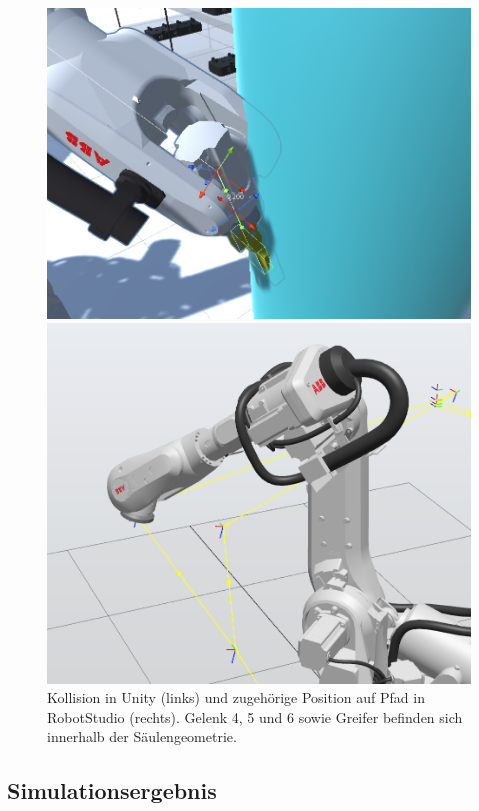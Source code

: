 \begin{figure}[!htb]
	\centering
	\begin{minipage}{.535\textwidth}
		\centering
		\includegraphics[width=0.9\linewidth]{Figures/CollisionUnity.png}
	\end{minipage}%
	\begin{minipage}{0.465\textwidth}
		\centering
		\includegraphics[width=0.9\linewidth]{Figures/CollisionPathRobotStudio.png}
	\end{minipage}
	\caption{Kollision in Unity (links) und zugehörige Position auf Pfad in
		RobotStudio (rechts). Gelenk 4, 5 und 6 sowie Greifer befinden sich innerhalb der
		Säulengeometrie.}
	\label{figure:kollision}
\end{figure}

\subsection{Simulationsergebnis}

